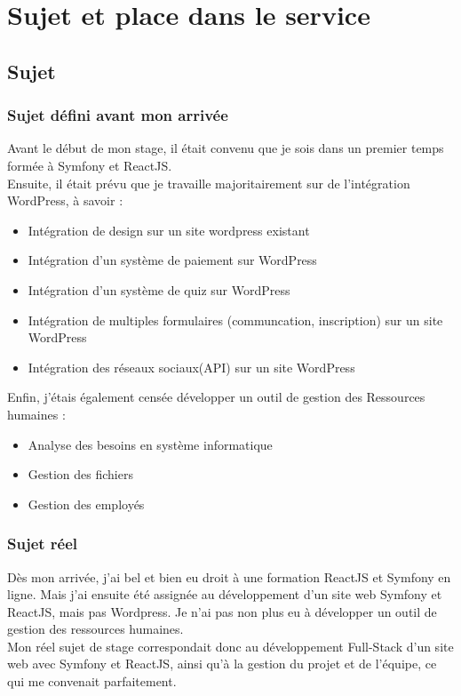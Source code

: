 \section{Sujet et place dans le service}
\subsection{Sujet}
\subsubsection{Sujet défini avant mon arrivée}

Avant le début de mon stage, il était convenu que je sois dans un premier temps formée à Symfony et ReactJS.
\\
Ensuite, il était prévu que je travaille majoritairement sur de l'intégration WordPress, à savoir :
\begin{itemize}
    \item Intégration de design sur un site wordpress existant
    \item Intégration d’un système de paiement sur WordPress
    \item Intégration d’un système de quiz sur WordPress
    \item Intégration de multiples formulaires (communcation, inscription) sur un site 
    WordPress
    \item Intégration des réseaux sociaux(API) sur un site WordPress
\end{itemize}
\bigbreak
Enfin, j'étais également censée développer un outil de gestion des Ressources humaines :
\begin{itemize}
    \item Analyse des besoins en système informatique
    \item Gestion des fichiers
    \item Gestion des employés
\end{itemize}


\subsubsection{Sujet réel}
Dès mon arrivée, j'ai bel et bien eu droit à une formation ReactJS et Symfony en ligne.
Mais j'ai ensuite été assignée au développement d'un site web Symfony et ReactJS, mais pas Wordpress.
Je n'ai pas non plus eu à développer un outil de gestion des ressources humaines. 
\\
Mon réel sujet de stage correspondait donc au développement Full-Stack d'un site web avec Symfony et ReactJS, 
ainsi qu'à la gestion du projet et de l'équipe, ce qui me convenait parfaitement.

